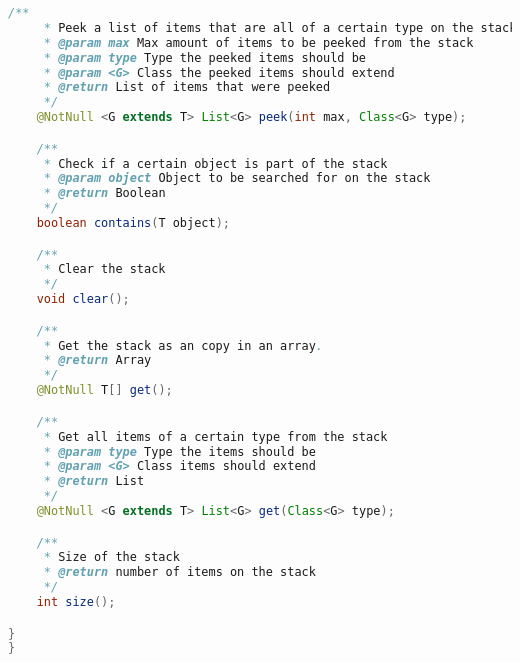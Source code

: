 \begin{lstlisting}[caption=StackInterface (Keienburg),label=list:StackInterface,language=Java]
    /**
     * Peek a list of items that are all of a certain type on the stack
     * @param max Max amount of items to be peeked from the stack
     * @param type Type the peeked items should be
     * @param <G> Class the peeked items should extend
     * @return List of items that were peeked
     */
    @NotNull <G extends T> List<G> peek(int max, Class<G> type);

    /**
     * Check if a certain object is part of the stack
     * @param object Object to be searched for on the stack
     * @return Boolean
     */
    boolean contains(T object);

    /**
     * Clear the stack
     */
    void clear();

    /**
     * Get the stack as an copy in an array.
     * @return Array
     */
    @NotNull T[] get();

    /**
     * Get all items of a certain type from the stack
     * @param type Type the items should be
     * @param <G> Class items should extend
     * @return List
     */
    @NotNull <G extends T> List<G> get(Class<G> type);

    /**
     * Size of the stack
     * @return number of items on the stack
     */
    int size();

}
}
\end{lstlisting}    

